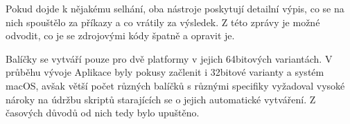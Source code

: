 Pokud dojde k nějakému selhání, oba nástroje poskytují detailní výpis, co se na nich spouštělo za příkazy a co vrátily za výsledek. Z této zprávy je možné odvodit, co je se zdrojovými kódy špatně a opravit je.

Balíčky se vytváří pouze pro dvě platformy v jejich 64bitových variantách. V průběhu vývoje Aplikace byly pokusy začlenit i 32bitové varianty a systém macOS, avšak větší počet různých balíčků s různými specifiky vyžadoval vysoké nároky na údržbu skriptů starajících se o jejich automatické vytváření. Z časových důvodů od nich tedy bylo upuštěno.
